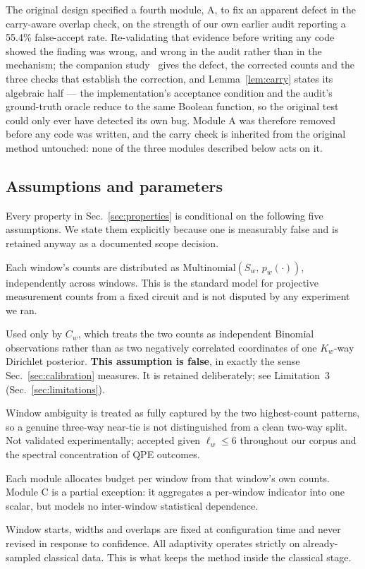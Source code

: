 \documentclass[final,5p,times,longtitle]{elsarticle}
\newcommand{\Cw}{C_w}
\begin{document}
The original design specified a fourth module, A, to fix an apparent defect
in the carry-aware overlap check, on the strength of our own earlier audit
reporting a 55.4\% false-accept rate. Re-validating that evidence before
writing any code showed the finding was wrong, and wrong in the audit
rather than in the mechanism; the companion study~\cite{companion} gives
the defect, the corrected counts and the three checks that establish the
correction, and Lemma~\ref{lem:carry} states its algebraic half --- the
implementation's acceptance condition and the audit's ground-truth oracle
reduce to the same Boolean function, so the original test could only ever
have detected its own bug. Module A was therefore removed before any code
was written, and the carry check is inherited from the original method
untouched: none of the three modules described below acts on it.

\subsection{Assumptions and parameters}
\label{sec:assumptions}

Every property in Sec.~\ref{sec:properties} is conditional on the
following five assumptions. We state them explicitly because one is
measurably false and is retained anyway as a documented scope decision.

\begin{description}\itemsep2pt
\item[(A1) Per-window multinomial sampling.]
Each window's counts are distributed as
$\mathrm{Multinomial}(S_w,\,p_w(\cdot))$, independently across windows.
This is the standard model for projective measurement counts from a
fixed circuit and is not disputed by any experiment we ran.
\item[(A2) Independence of the top-2 marginals.] Used only by $\Cw$,
which treats the two counts as independent Binomial observations rather
than as two negatively correlated coordinates of one $K_w$-way Dirichlet
posterior. \textbf{This assumption is false}, in exactly the sense
Sec.~\ref{sec:calibration} measures. It is retained deliberately; see
Limitation~3 (Sec.~\ref{sec:limitations}).
\item[(A3) Top-2 sufficiency.] Window ambiguity is treated as fully
captured by the two highest-count patterns, so a genuine three-way
near-tie is not distinguished from a clean two-way split. Not validated
experimentally; accepted given $\ell_w\le6$ throughout our corpus and the
spectral concentration of QPE outcomes.
\item[(A4) No cross-window coupling.] Each module allocates budget per
window from that window's own counts. Module C is a partial exception: it
aggregates a per-window indicator into one scalar, but models no
inter-window statistical dependence.
\item[(A5) Static circuit geometry.] Window starts, widths and overlaps
are fixed at configuration time and never revised in response to
confidence. All adaptivity operates strictly on already-sampled classical
data. This is what keeps the method inside the classical stage.
\end{description}
\end{document}
